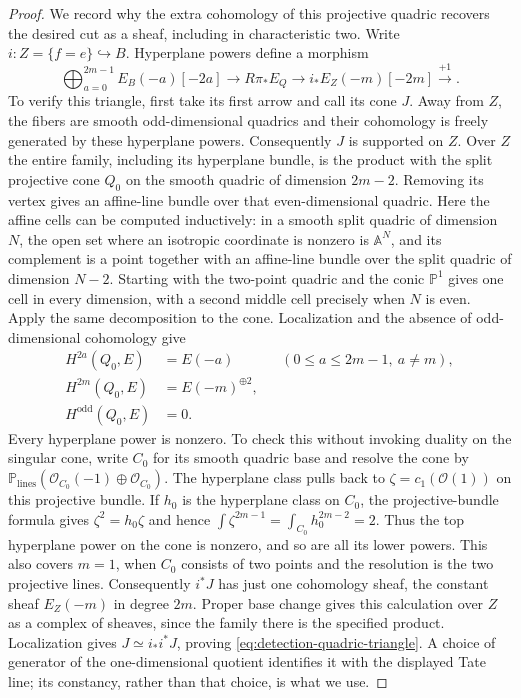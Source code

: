 \begin{proof}
We record why the extra cohomology of this projective quadric recovers
the desired cut as a sheaf, including in characteristic two.  Write
$i:Z=\{f=e\}\hookrightarrow B$.  Hyperplane powers define a morphism
\begin{equation}\label{eq:detection-quadric-triangle}
 \bigoplus_{a=0}^{2m-1}E_B(-a)[-2a]\longrightarrow R\pi_*E_Q
 \longrightarrow i_*E_Z(-m)[-2m]\xrightarrow{+1}.
\end{equation}
To verify this triangle, first take its first arrow and call its cone
$J$.  Away from $Z$, the fibers are smooth odd-dimensional quadrics and
their cohomology is freely generated by these hyperplane powers.
Consequently $J$ is supported on $Z$.  Over $Z$ the entire family,
including its hyperplane bundle, is the product with the split projective
cone $Q_0$ on the smooth quadric of dimension $2m-2$.  Removing its
vertex gives an affine-line bundle over that even-dimensional quadric.
Here the affine cells can be computed inductively: in a smooth split
quadric of dimension $N$, the open set where an isotropic coordinate is
nonzero is $\mathbb A^N$, and its complement is a point together with
an affine-line bundle over the split quadric of dimension $N-2$.
Starting with the two-point quadric and the conic $\mathbb P^1$ gives
one cell in every dimension, with a second middle cell precisely when
$N$ is even.  Apply the same decomposition to the cone.  Localization
and the absence of odd-dimensional cohomology give
\[
 \begin{aligned}
 H^{2a}(Q_0,E)&=E(-a)
                    &&(0\leq a\leq2m-1,\ a\ne m),\\
 H^{2m}(Q_0,E)&=E(-m)^{\oplus2},\\
 H^{\mathrm{odd}}(Q_0,E)&=0.
 \end{aligned}
\]
Every hyperplane power is nonzero.  To check this without invoking
duality on the singular cone, write $C_0$ for its smooth quadric base
and resolve the cone by
$\mathbb P_{\mathrm{lines}}(\mathcal O_{C_0}(-1)\oplus\mathcal O_{C_0})$.
The hyperplane class pulls back to $\zeta=c_1(\mathcal O(1))$ on this
projective bundle.  If $h_0$ is the hyperplane class on $C_0$, the
projective-bundle formula gives $\zeta^2=h_0\zeta$ and hence
$\int\zeta^{2m-1}=\int_{C_0}h_0^{2m-2}=2$.
Thus the top hyperplane power on the cone is nonzero, and so are all
its lower powers.  This also covers $m=1$, when $C_0$ consists of two
points and the resolution is the two projective lines.
Consequently $i^*J$ has just one cohomology
sheaf, the constant sheaf $E_Z(-m)$ in degree $2m$.
Proper base change gives this calculation over $Z$ as a complex of
sheaves, since the family there is the specified product.  Localization
gives $J\simeq i_*i^*J$, proving
\eqref{eq:detection-quadric-triangle}.  A choice of generator of the
one-dimensional quotient identifies it with the displayed Tate line;
its constancy, rather than that choice, is what we use.


\end{proof}
